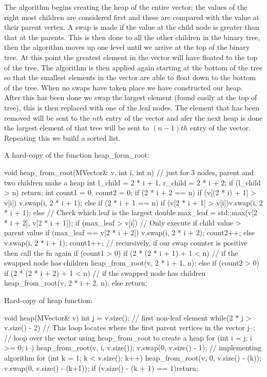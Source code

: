 \documentclass[a4paper, 12pt]{article}
\begin{document}
The algorithm begins creating the heap of the entire vector; the values of the right most children are considered first and these are compared with the value at their parent vertex. A swap is made if the value at the child node is greater than that at the parents. This is then done to all the other children in the binary tree, then the algorithm moves up one level until we arrive at the top of the binary tree. At this point the greatest element in the vector will have floated to the top of the tree. The algorithm is then applied again starting at the bottom of the tree so that the smallest elements in the vector are able to float down to the bottom of the tree. When no swaps have taken place we have constructed our heap. \\

After this has been done we swap the largest element (found easily at the top of tree), this is then replaced with one of the leaf nodes. The element that has been removed will be sent to the $nth$ entry of the vector and afer the next heap is done the largest element of that tree will be sent to $(n-1)th$ entry of the vector. Repeating this we build a sorted list.    

A hard-copy of the function heap{\_}form{\_}root:
\begin{spverbatim}
void heap_from_root(MVector& v, int i, int n)
{
	// just for 3 nodes, parent and two children make a heap
	int l_child = 2 * i + 1, r_child = 2 * i + 2;
	if (l_child > n) { return; }
	int count1 = 0, count2 = 0;		
	if (2 * i + 2 == n)
		{
		if (v[(2 * i) + 1] > v[i])			
		{
			v.swap(i, 2 * i + 1);
		}
	}
	else if (2 * i + 1 == n)
	{
		if (v[2 * i + 1] > v[i]){v.swap(i, 2 * i + 1);}
	}
	else {
		// Check which leaf is the largest                     
		double max_leaf = std::max(v[2 * i + 2], v[2 * i + 1]);
		if (max_leaf > v[i]) // Only execute if child value > parent value
		{
			if (max_leaf == v[2 * i + 2])
			{
				v.swap(i, 2 * i + 2);
				count2++;
			}
			else {
				v.swap(i, 2 * i + 1);
				count1++;
			}
		}
	}
	// recursively, if our swap counter is positive then call the fn again
	if (count1 > 0)
	{
		if (2 * (2 * i + 1) + 1 < n) // if the swapped node has children
		{
			heap_from_root(v, 2 * i + 1, n);
		}
	}
	else if (count2 > 0)
	{
		if (2 * (2 * i + 2) + 1 < n) // if the swapped node has children
		{
			heap_from_root(v, 2 * i + 2, n);
		}
	}
	else {return; }
}
\end{spverbatim}
Hard-copy of heap function:
\begin{spverbatim}
void heap(MVector& v)
{
	int j = v.size();
	// first non-leaf element
	while(2 * j > v.size() - 2) // This loop locates where the first parent vertices in the vector
	{
		j--;
	}
	// loop over the vector using heap_from_root to create a heap 
	for (int i = j; i >= 0; i--)
	{
		heap_from_root(v, i, v.size());
	}
	v.swap(0, v.size() - 1);
	// implementing algorithm
	for (int k = 1; k < v.size(); k++)
	{	
		heap_from_root(v, 0, v.size() - (k));
		v.swap(0, v.size() - (k+1));
		if (v.size() - (k + 1) == 1){return;}
	}
}
\end{spverbatim}
\end{document}
